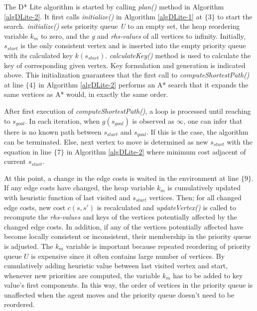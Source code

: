 The D* Lite algorithm is started by calling \textit{plan()} method in Algorithm \ref{algDLite-2}. It first calls \textit{initialize()} in Algorithm \ref{algDLite-1} at $\lbrace 3 \rbrace$ to start the search. \textit{initialize()} sets priority queue \textit{U} to an empty set, the heap reordering variable $k_{m}$ to zero, and the \textit{g} and \textit{rhs-values} of all vertices to infinity. Initially, $s_{start}$ is the only consistent vertex and is inserted into the empty priority queue with its calculated key $k(s_{start})$. \textit{calculateKey()} method is used to calculate the key of corresponding given vertex. Key formulation and generation is indicated above. This initialization guarantees that the first call to \textit{computeShortestPath()} at line $\lbrace 4 \rbrace$ in Algorithm \ref{algDLite-2} performs an A* search that it expands the same vertices as A* would, in exactly the same order.

After first execution of \textit{computeShortestPath()}, a loop is processed until reaching to $s_{goal}$. In each iteration, when $g(s_{goal})$ is observed as $\infty$, one can infer that there is no known path between $s_{start}$ and $s_{goal}$. If this is the case, the algorithm can be terminated. Else, next vertex to move is determined as new $s_{start}$ with the equation in line $\lbrace 7 \rbrace$ in Algorithm \ref{algDLite-2} where minimum cost adjacent of current $s_{start}$.

At this point, a change in the edge costs is waited in the environment at line $\lbrace 9 \rbrace$. If any edge costs have changed, the heap variable $k_{m}$ is cumulatively updated with heuristic function of last visited and $s_{start}$ vertices. Then; for all changed edge costs, new cost $c(s, s')$ is recalculated and \textit{updateVertex()} is called to recompute the \textit{rhs-values} and keys of the vertices potentially affected by the changed edge costs. In addition, if any of the vertices potentially affected have become locally consistent or inconsistent, their membership in the priority queue is adjusted. The $k_{m}$ variable is important because repeated reordering of priority queue $U$ is expensive since it often contains large number of vertices. By cumulatively adding heuristic value between last visited vertex and start, whenever new priorities are computed, the variable $k_{m}$ has to be added to key value's first components. In this way, the order of vertices in the priority queue is unaffected when the agent moves and the priority queue doesn't need to be reordered.

